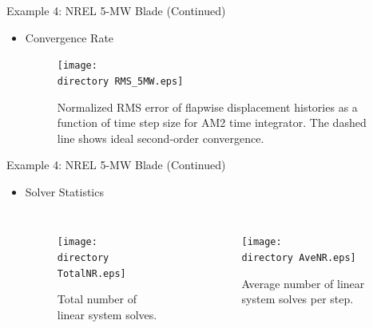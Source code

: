 \documentclass[dvips,xcolor=cmyk]{beamer}
\def\directory{EPSF/}
\begin{document}
\begin{frame}{Example 4: NREL 5-MW Blade (Continued)}
  \begin{itemize}
      \item Convergence Rate
      \begin{figure}
\centering
\texttt{[image: \\directory RMS\_5MW.eps]}
\caption{ Normalized RMS error of flapwise displacement histories as a function of time step size for AM2 time integrator. The dashed line shows ideal second-order convergence.} 
\label{RMS_5MW}
\end{figure}
  \end{itemize}
\end{frame}

\begin{frame}{Example 4: NREL 5-MW Blade (Continued)}
  \begin{itemize}
      \item Solver Statistics
      
      \begin{columns}[c]
      \column{2.0 in}
      \begin{figure}
\centering
\texttt{[image: \\directory TotalNR.eps]}
\caption{ Total number of linear system solves.} 
\end{figure}

     \column{2.0 in}
      \begin{figure}
\centering
\texttt{[image: \\directory AveNR.eps]}
\caption{ Average number of linear system solves per step.} 
\end{figure}
\end{columns}
  \end{itemize}
\end{frame}
\end{document}
